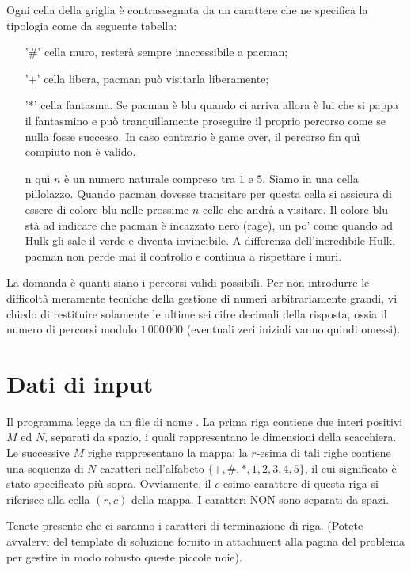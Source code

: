 Ogni cella della griglia è contrassegnata da un carattere che ne specifica la tipologia come da seguente tabella:
\begin{itemize}
   \item['\#'] cella muro, resterà sempre inaccessibile a pacman;
   \item['+'] cella libera, pacman può visitarla liberamente;
   \item['*'] cella fantasma. Se pacman è blu quando ci arriva allora è lui che si pappa il fantasmino e può tranquillamente proseguire il proprio percorso come se nulla fosse successo. In caso contrario è game over, il percorso fin quì compiuto non è valido.
   \item[n] quì $n$ è un numero naturale compreso tra $1$ e $5$. Siamo in una cella pillolazzo. Quando pacman dovesse transitare per questa cella si assicura di essere di colore blu nelle prossime $n$ celle che andrà a visitare. Il colore blu stà ad indicare che pacman è incazzato nero (rage), un po' come quando ad Hulk gli sale il verde e diventa invincibile. A differenza dell'incredibile Hulk, pacman non perde mai il controllo e continua a rispettare i muri.
\end{itemize}

La domanda \`e quanti siano i percorsi validi possibili.
Per non introdurre le difficolt\`a meramente tecniche della gestione di numeri arbitrariamente grandi, vi chiedo di restituire solamente le ultime sei cifre decimali della risposta, ossia il numero di percorsi modulo $1\,000\,000$ (eventuali zeri iniziali vanno quindi omessi).

\section*{Dati di input}
Il programma legge da un file di nome . La prima riga contiene due interi positivi $M$ ed $N$, separati da spazio, i quali rappresentano le dimensioni della scacchiera.
Le successive $M$ righe rappresentano la mappa: la $r$-esima di tali righe contiene una
sequenza di $N$ caratteri nell'alfabeto $\{+,\#,*,1,2,3,4,5\}$, il cui significato è stato specificato più sopra.
Ovviamente, il $c$-esimo carattere di questa riga si riferisce alla cella $(r, c)$ della mappa. I caratteri NON sono separati da spazi.

Tenete presente che ci saranno i caratteri di terminazione di riga. (Potete avvalervi del template di soluzione fornito in attachment alla pagina del problema per gestire in modo robusto queste piccole noie). 

